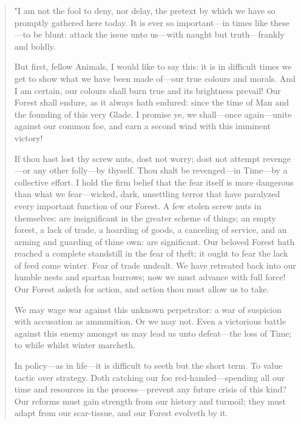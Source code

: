 \begingroup
\fontsize{10pt}{12pt}\selectfont
	\begin{quote}
		"I am not the fool to deny, nor delay, the pretext by which we have so promptly gathered here today. It is ever so important---in times like these---to be blunt: attack the issue unto us---with naught but truth---frankly and boldly. 
		
		
		But first, fellow Animals, I would like to say this: it is in difficult times we get to show what we have been made of---our true colours and morals. And I am certain, our colours shall burn true and its brightness prevail! Our Forest shall endure, as it always hath endured: since the time of Man and the founding of this very Glade. I promise ye, we shall---once again---unite against our common foe, and earn a second wind with this imminent victory!
		
		If thou hast lost thy screw nuts, dost not worry; dost not attempt revenge---or any other folly---by thyself. Thou shalt be revenged---in Time---by a collective effort. I hold the firm belief that the fear itself is more dangerous than what we fear---wicked, dark, unsettling terror that have paralyzed every important function of our Forest. A few stolen screw nuts in themselves: are insignificant in the greater scheme of things; an empty forest, a lack of trade, a hoarding of goods, a canceling of service, and an arming and guarding of thine own: are significant. Our beloved Forest hath reached a complete standstill in the fear of theft; it ought to fear the lack of feed come winter. Fear of trade undealt. We have retreated back into our humble nests and spartan burrows; now we must advance with full force! Our Forest asketh for action, and action thou must allow us to take.
		
		We may wage war against this unknown perpetrator: a war of suspicion with accusation as ammunition. Or we may not. Even a victorious battle against this enemy amongst us may lead us unto defeat---the loss of Time; to while whilst winter marcheth.
		
		In policy---as in life---it is difficult to seeth but the short term. To value tactic over strategy. Doth catching our foe red-handed---spending all our time and resources in the process---prevent any future crisis of this kind? Our reforms must gain strength from our history and turmoil; they must adapt from our scar-tissue, and our Forest evolveth by it.
		

\end{quote}
